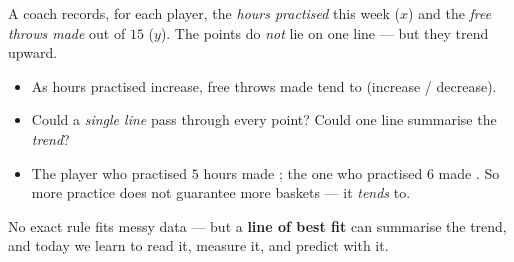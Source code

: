 \documentclass[10pt]{article}
\newcommand{\lgrid}[4]{%
  \draw[step=1, linegray!40, very thin] (#1,#3) grid (#2,#4);
  \draw[->, semithick, charcoal] (#1,0)--(#2,0) node[below right, font=\scriptsize]{$x$};
  \draw[->, semithick, charcoal] (0,#3)--(0,#4) node[left, font=\scriptsize]{$y$};}
\newcommand{\dpt}[2]{\fill[navy] (#1,#2) circle (2.6pt);}
\newcommand{\ftdata}{\dpt{1}{4}\dpt{2}{4}\dpt{3}{7}\dpt{4}{7}\dpt{5}{11}\dpt{6}{11}\dpt{7}{12}\dpt{8}{14}}
\begin{document}
\begin{hookbox}
A coach records, for each player, the \emph{hours practised} this week ($x$) and the \emph{free
throws made} out of $15$ ($y$). The points do \emph{not} lie on one line --- but they trend upward.
\begin{center}
\begin{minipage}[c]{0.40\linewidth}\centering
{}
\end{minipage}\hfill
\begin{minipage}[c]{0.56\linewidth}
\begin{itemize}\setlength{\itemsep}{2pt}
  \item As hours practised increase, free throws made tend to  (increase / decrease).
  \item Could a \emph{single line} pass through every point?  \; Could one line
        summarise the \emph{trend}? 
  \item The player who practised $5$ hours made ; the one who practised $6$ made
        . So more practice does not guarantee more baskets --- it \emph{tends} to.
\end{itemize}
\end{minipage}
\end{center}
No exact rule fits messy data --- but a \textbf{line of best fit} can summarise the trend, and
today we learn to read it, measure it, and predict with it.
\end{hookbox}
\end{document}
